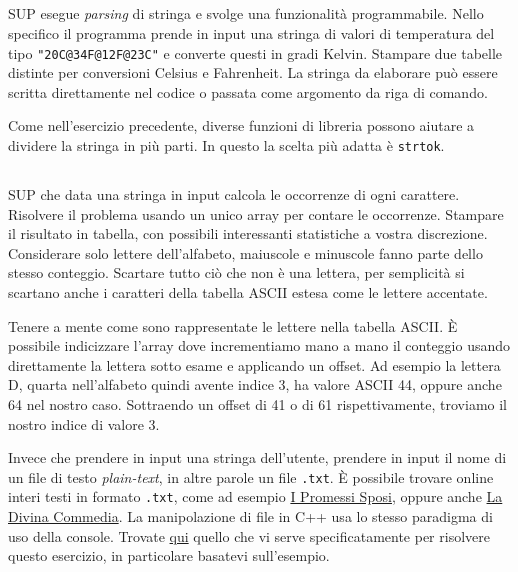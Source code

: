 \documentclass{article}
\begin{document}
\subsection{}
SUP esegue \textit{parsing} di stringa e svolge una funzionalità programmabile. Nello specifico il programma prende in input una stringa di valori di temperatura del tipo \texttt{"20C@34F@12F@23C"} e converte questi in gradi Kelvin. Stampare due tabelle distinte per conversioni Celsius e Fahrenheit. La stringa da elaborare può essere scritta direttamente nel codice o passata come argomento da riga di comando.
\begin{info}
	Come nell'esercizio precedente, diverse funzioni di libreria possono aiutare a dividere la stringa in più parti. In questo la scelta più adatta è \texttt{strtok}.
\end{info}

\clearpage

\subsection{}
SUP che data una stringa in input calcola le occorrenze di ogni carattere. Risolvere il problema usando un unico array per contare le occorrenze. Stampare il risultato in tabella, con possibili interessanti statistiche a vostra discrezione. Considerare solo lettere dell'alfabeto, maiuscole e minuscole fanno parte dello stesso conteggio. Scartare tutto ciò che non è una lettera, per semplicità si scartano anche i caratteri della tabella ASCII estesa come le lettere accentate.
\begin{info}
	Tenere a mente come sono rappresentate le lettere nella tabella ASCII. È possibile indicizzare l'array dove incrementiamo mano a mano il conteggio usando direttamente la lettera sotto esame e applicando un offset. Ad esempio la lettera D, quarta nell'alfabeto quindi avente indice 3, ha valore ASCII 44, oppure anche 64 nel nostro caso. Sottraendo un offset di 41 o di 61 rispettivamente, troviamo il nostro indice di valore 3.
\end{info}
\begin{warn} 
	Invece che prendere in input una stringa dell'utente, prendere in input il nome di un file di testo \textit{plain-text}, in altre parole un file \texttt{.txt}. È possibile trovare online interi testi in formato \texttt{.txt}, come ad esempio \href{http://rosada.yolasite.com/resources/i_promessi\%20sposi.txt}{I Promessi Sposi}, oppure anche \href{https://raw.githubusercontent.com/dlang/druntime/master/benchmark/extra-files/dante.txt}{La Divina Commedia}. La manipolazione di file in C++ usa lo stesso paradigma di uso della console. Trovate \href{http://www.cplusplus.com/reference/istream/istream/get/}{qui} quello che vi serve specificatamente per risolvere questo esercizio, in particolare basatevi sull'esempio.
\end{warn}
\end{document}
